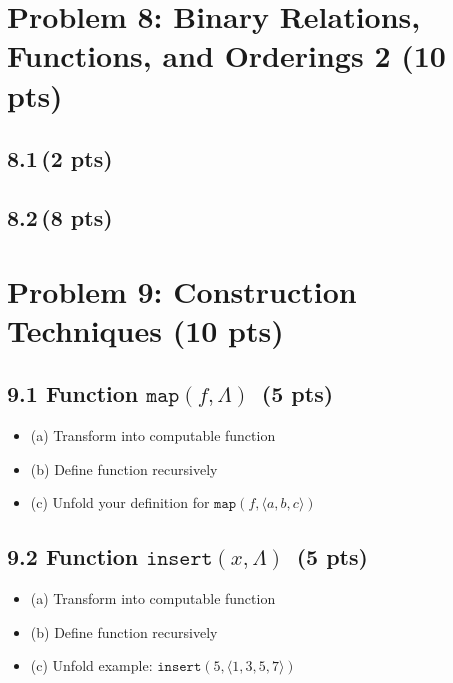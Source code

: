 \documentclass[12pt]{article}
\begin{document}
\newpage
\section{Problem 8: Binary Relations, Functions, and Orderings 2 (10 pts)}

\subsection*{8.1\,(2 pts)}

\subsection*{8.2\,(8 pts)}

\newpage
\section{Problem 9: Construction Techniques (10 pts)}

\subsection*{9.1 Function \(\texttt{map}(f,\Lambda)\) \,(5 pts)}
\begin{itemize}
    \item (a) Transform into computable function
    \item (b) Define function recursively
    \item (c) Unfold your definition for \(\texttt{map}(f,\langle a,b,c\rangle)\)
\end{itemize}

\subsection*{9.2 Function \(\texttt{insert}(x,\Lambda)\) \,(5 pts)}
\begin{itemize}
    \item (a) Transform into computable function
    \item (b) Define function recursively
    \item (c) Unfold example: \(\texttt{insert}(5,\langle 1,3,5,7\rangle)\)
\end{itemize}

\newpage
\end{document}

